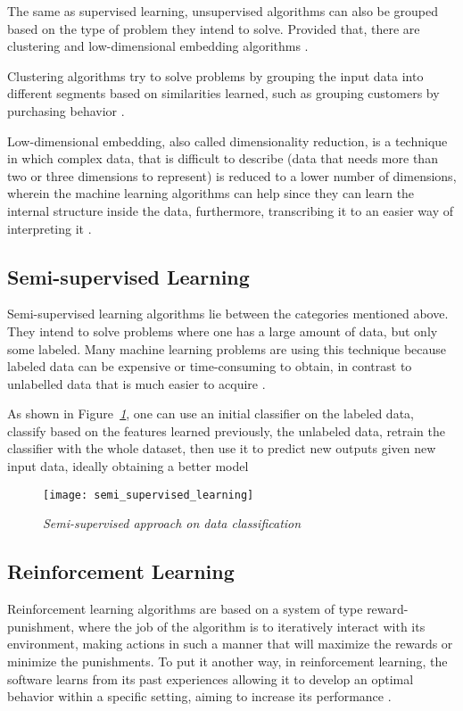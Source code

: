 The same as supervised learning, unsupervised algorithms can also be grouped
based on the type of problem they intend to solve. Provided that,
there are clustering and low-dimensional embedding algorithms \cite{amai}.

Clustering algorithms try to solve problems by grouping the input data
into different segments based on similarities learned,
such as grouping customers by purchasing behavior \cite{brownlee2016master}.


Low-dimensional embedding, also called dimensionality reduction,
is a technique in which complex data, that is difficult to describe
(data that needs more than two or three dimensions to represent)
is reduced to a lower number of dimensions,
wherein the machine learning algorithms can help
since they can learn the internal structure inside the data, furthermore,
transcribing it to an easier way of interpreting it \cite{amai}.


\subsection{Semi-supervised Learning}
Semi-supervised learning algorithms lie between the categories mentioned above.
They intend to solve problems where one has a large amount of data, but only some labeled.
Many machine learning problems are using this technique because labeled data can be expensive or
time-consuming to obtain,
in contrast to unlabelled data that is much easier to acquire \cite{brownlee2016master}.

As shown in Figure\emph{~\ref{fig:semi_supervised_learning}}, one can use an initial classifier on the labeled data,
classify based on the features learned previously, the unlabeled data,
retrain the classifier with the whole dataset,
then use it to predict new outputs given new input data, ideally obtaining a better model \cite{lotte2015}

\begin{figure}[h]
  \centering
  \texttt{[image: semi\_supervised\_learning]}
  \caption{\emph{Semi-supervised approach on data classification \cite{lotte2015}}}
  \label{fig:semi_supervised_learning}
\end{figure}

\subsection{Reinforcement Learning}
Reinforcement learning algorithms are based on a system of type reward-punishment,
where the job of the algorithm is to iteratively interact with its environment,
making actions in such a manner that will maximize the rewards or minimize the punishments.
To put it another way, in reinforcement learning,
the software learns from its past experiences allowing it to develop an optimal
behavior within a specific setting, aiming to increase its performance \cite{typesMLMedium}.


